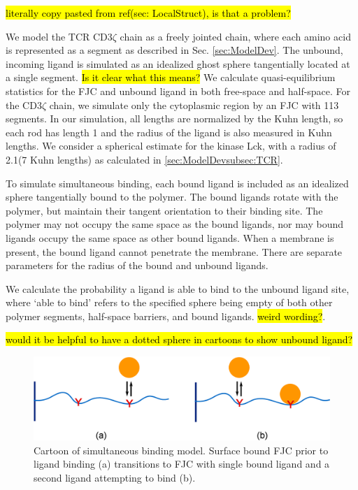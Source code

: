 \documentclass[../../AdvancementSummary.tex]{subfiles}
\begin{document}
\hl{literally copy pasted from ref(sec: LocalStruct), is that a problem?}

We model the TCR CD3$\zeta$ chain as a freely jointed chain, where each amino acid is represented as a segment as described in Sec. \ref{sec:ModelDev}. The unbound, incoming ligand is simulated as an idealized ghost sphere tangentially located at a single segment. \hl{Is it clear what this means?} We calculate quasi-equilibrium statistics for the FJC and unbound ligand in both free-space and half-space. For the CD3$\zeta$ chain, we simulate only the cytoplasmic region by an FJC with 113 segments. In our simulation, all lengths are normalized by the Kuhn length, so each rod has length 1 and the radius of the ligand is also measured in Kuhn lengths. We consider a spherical estimate for the kinase Lck, with a radius of 2.1\nm (7 Kuhn lengths) as calculated in \ref{sec:ModelDevsubsec:TCR}.

To simulate simultaneous binding, each bound ligand is included as an idealized sphere tangentially bound to the polymer.  The bound ligands rotate with the polymer, but maintain their tangent orientation to their binding site. The polymer may not occupy the same space as the bound ligands, nor may bound ligands occupy the same space as other bound ligands. When a membrane is present, the bound ligand cannot penetrate the membrane. There are separate parameters for the radius of the bound and unbound ligands. 

We calculate the probability a ligand is able to bind to the unbound ligand site, where `able to bind' refers to the specified sphere being empty of both other polymer segments, half-space barriers, and bound ligands. \hl{weird wording?}. 

\hl{would it be helpful to have a dotted sphere in cartoons to show unbound ligand?}

\begin{figure}[H]
\begin{center}
    \includegraphics[width=0.8\linewidth]{ResultsFigures/SimultaneousBindingDiagram/SimultaneousBindingDiagram.eps}
    \caption{Cartoon of simultaneous binding model. Surface bound FJC prior to ligand binding (a) transitions to FJC with single bound ligand and a second ligand attempting to bind (b). \label{fig: SimBindCartoon}}
    \end{center}
\end{figure}
\end{document}
